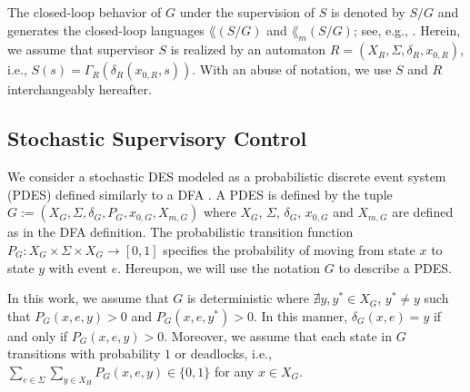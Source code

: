 The closed-loop behavior of $G$ under the supervision of $S$ is denoted by $S/G$ and generates the closed-loop languages $\lang(S/G)$ and $\lang_m(S/G)$; see, e.g., \citep{Lafortune:2021,Wonham:2018}.
Herein, we assume that supervisor $S$ is realized by an automaton $R = (X_R,\Sigma,\delta_R,x_{0,R})$, i.e., $S(s) = \Gamma_R(\delta_R(x_{0,R},s))$.
With an abuse of notation, we use $S$ and $R$ interchangeably hereafter.



\subsection{Stochastic Supervisory Control}\label{subsect:sdes}
We consider a stochastic DES modeled as a probabilistic discrete event system (PDES) defined similarly to a DFA \citep{Lawford:1993,Garg:1999,Pantelic:2014}. 
A PDES is defined by the tuple $G := (X_G,\Sigma,\allowbreak \delta_G, P_G,x_{0,G},X_{m,G})$ where $X_G$, $\Sigma$, $\delta_G$, $x_{0,G}$ and $X_{m,G}$ are defined as in the DFA definition.
The probabilistic transition function $P_G:X_G\times\Sigma\times X_G\rightarrow [0,1]$ specifies the probability of moving from state $x$ to state $y$ with event $e$. 
Hereupon, we will use the notation $G$ to describe a PDES.

In this work, we assume that $G$ is deterministic where $\nexists y,y^*\in X_G$, $y^*\neq y$ such that $P_G(x,e,y)>0$ and $P_G(x,e,y^*)>0$.
In this manner, $\delta_G(x,e)= y$ if and only if $P_G(x,e,y) > 0$.
Moreover, we assume that each state in $G$ transitions with probability $1$ or deadlocks, i.e.,  $\sum_{e\in \Sigma} \sum_{y\in X_H} P_G(x,e,y) \in \{0,1\}$ for any $x \in X_G$.

